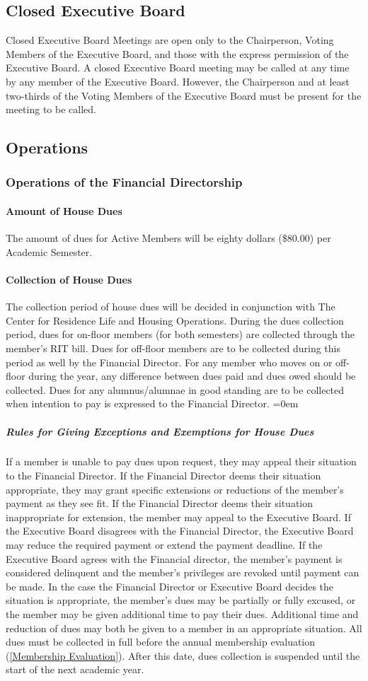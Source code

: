 \documentclass{article}
\newcommand{\asection}[1]{\subsection{#1} \label{#1}}
\newcommand{\asubsection}[1]{\subsubsection{#1} \label{#1}}
\newcommand{\asubsubsection}[1]{\paragraph{#1} \label{#1}}
\newcommand{\asubsubsubsection}[1]{\parindent=0em\subparagraph{#1} \label{#1}}
\begin{document}
\asection{Closed Executive Board}
Closed Executive Board Meetings are open only to the Chairperson, Voting Members of the Executive Board, and those with the express permission of the Executive Board.
A closed Executive Board meeting may be called at any time by any member of the Executive Board.
However, the Chairperson and at least two-thirds of the Voting Members of the Executive Board must be present for the meeting to be called.

\asection{Operations}
\asubsection{Operations of the Financial Directorship}
\asubsubsection{Amount of House Dues}
The amount of dues for Active Members will be eighty dollars (\$80.00) per Academic Semester.
\asubsubsection{Collection of House Dues}
The collection period of house dues will be decided in conjunction with The Center for Residence Life and Housing Operations.
During the dues collection period, dues for on-floor members (for both semesters) are collected through the member’s RIT bill.
Dues for off-floor members are to be collected during this period as well by the Financial Director.
For any member who moves on or off-floor during the year, any difference between dues paid and dues owed should be collected.
Dues for any alumnus/alumnae in good standing are to be collected when intention to pay is expressed to the Financial Director.
\asubsubsubsection{Rules for Giving Exceptions and Exemptions for House Dues}
If a member is unable to pay dues upon request, they may appeal their situation to the Financial Director.
If the Financial Director deems their situation appropriate, they may grant specific extensions or reductions of the member's payment as they see fit.
If the Financial Director deems their situation inappropriate for extension, the member may appeal to the Executive Board.
If the Executive Board disagrees with the Financial Director, the Executive Board may reduce the required payment or extend the payment deadline.
If the Executive Board agrees with the Financial director, the member’s payment is considered delinquent and the member’s privileges are revoked until payment can be made.
In the case the Financial Director or Executive Board decides the situation is appropriate, the member's dues may be partially or fully excused, or the member may be given additional time to pay their dues. 
Additional time and reduction of dues may both be given to a member in an appropriate situation.
All dues must be collected in full before the annual membership evaluation (\ref{Membership Evaluation}).
After this date, dues collection is suspended until the start of the next academic year.
\end{document}
